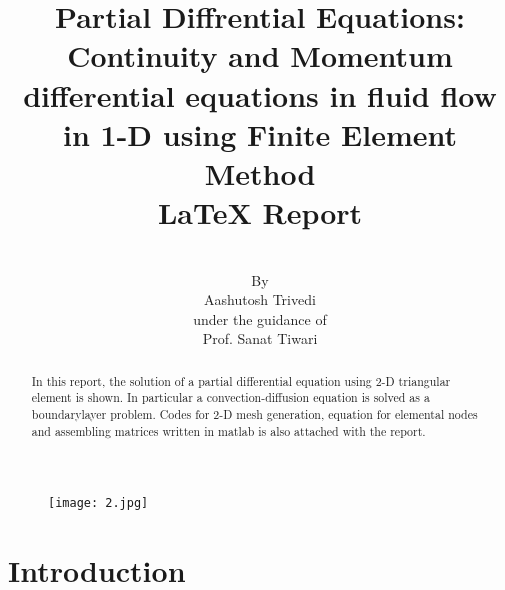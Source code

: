 \documentclass[9pt]{article}
\begin{document}
\title{Partial Diffrential Equations: Continuity and Momentum differential equations in fluid flow in 1-D using Finite Element Method \\  \LaTeX{} Report}
\author{\\ By \\Aashutosh Trivedi \\ under the guidance of \\ Prof. Sanat Tiwari}

\maketitle
\begin{figure}[h]
\centering
\texttt{[image: 2.jpg]}
\end{figure}

\begin{abstract}
In this report, the solution of a partial differential equation using 2-D triangular element is shown. In particular a convection-diffusion equation is solved as a boundarylayer problem. Codes for 2-D mesh generation, equation for elemental nodes and assembling matrices written in matlab is also attached with the report. 
\end{abstract}

\newpage

\section{Introduction}
\end{document}

